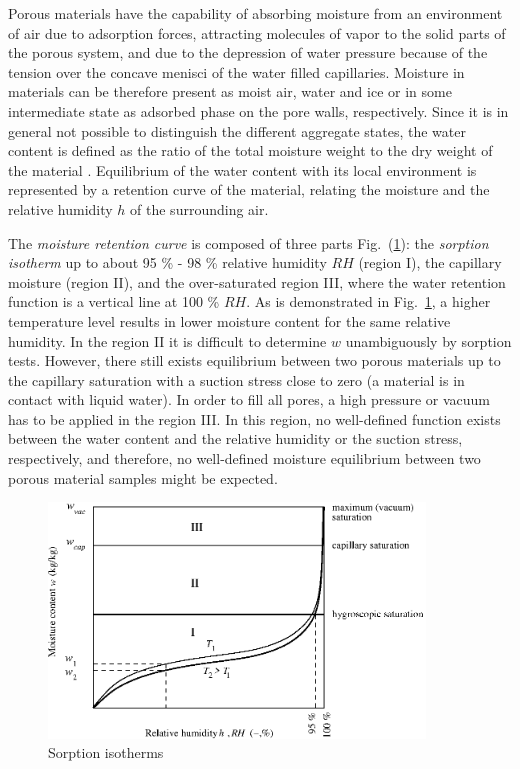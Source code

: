 Porous materials have the capability of absorbing moisture from an environment of air due to adsorption forces, 
attracting molecules of vapor to the solid parts of the porous system, and due to the depression of water pressure 
because of the tension over the concave menisci of the water filled capillaries. Moisture in materials can be therefore 
present as moist air, water and ice or in some intermediate state 
as adsorbed phase on the pore walls, respectively. Since it is in general not possible to distinguish the different 
aggregate states, the water content is defined as the ratio of the total moisture weight to the dry weight 
of the material \cite{ctu}. Equilibrium of the water content with its local environment is represented by a retention curve 
of the material, relating the moisture and the relative humidity $h$ of the surrounding air. 

The {\it moisture retention curve} is composed of three parts Fig.~(\ref{reten}): 
the {\it sorption isotherm} up to about 95 \% 
- 98 \% relative humidity $RH$ (region I), the capillary moisture (region II), and the over-saturated region III, where 
the water retention function is a vertical line at 100 \% $RH$. As is demonstrated in Fig.~\ref{reten}, a higher 
temperature level results in lower moisture content for the same relative humidity. In the region II it is difficult 
to determine $w$ unambiguously by sorption tests. However, there still exists equilibrium between two porous materials 
up to the capillary saturation with a suction stress close to zero (a material is in contact with liquid water). 
In order to fill all pores, a high pressure or vacuum has to be applied in the region III. In this region, 
no well-defined function exists between the water content and the relative humidity or the suction stress, respectively, 
and therefore, no well-defined moisture equilibrium between two porous material samples might be expected.
\begin{figure}[h!]
\begin{center}
\includegraphics[angle=0, width=10cm]{PS/reten.eps}
\caption{Sorption isotherms}
\label{reten}
\end{center}
\end{figure}

